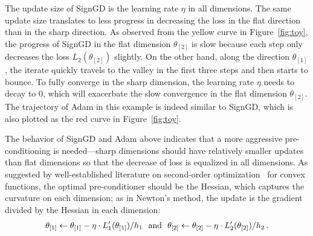 The update size of SignGD is the learning rate $\eta$ in all dimensions. The same update size translates to less progress in decreasing the loss in the flat direction than in the sharp direction. As observed from the yellow curve in Figure~\ref{fig:toy}, the progress of SignGD in the flat dimension $\theta_{[2]}$ is slow because each step only decreases the loss $L_2(\theta_{[2]})$ slightly. On the other hand, along the direction $\theta_{[1]}$, the iterate quickly travels to the valley in the first three steps and then starts to bounce. To fully converge in the sharp dimension, the learning rate $\eta$ needs to decay to 0, which will exacerbate the slow convergence in the flat dimension $\theta_{[2]}$. The trajectory of Adam in this example is indeed similar to SignGD, which is also plotted as the red curve in Figure~\ref{fig:toy}.

The behavior of SignGD and Adam above indicates that a more aggressive pre-conditioning is needed---sharp dimensions should have relatively smaller updates than flat dimensions so that the decrease of loss is equalized in all dimensions. As suggested by well-established literature on second-order optimization~\citep{boyd2004convex}  for convex functions, the optimal pre-conditioner should be the Hessian, which captures the curvature on each dimension; as in Newton's method, the update is the gradient divided by the Hessian in each dimension: 
\begin{align}
\theta_{[1]} \leftarrow \theta_{[1]} - \eta \cdot L'_1(\theta_{[1]}) / h_1\ \ \textup{and}\ \ \theta_{[2]} \leftarrow \theta_{[2]} - \eta \cdot L'_2(\theta_{[2]})/ h_2\,.
\end{align}

